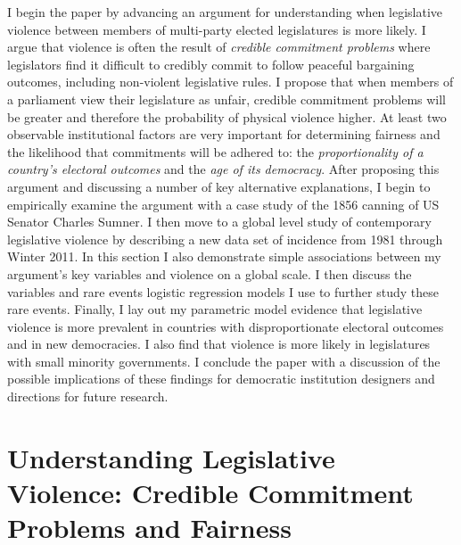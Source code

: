 \documentclass[a4paper]{article}\usepackage[]{graphicx}\usepackage[]{color}
\begin{document}
I begin the paper by advancing an argument for understanding when legislative violence between members of multi-party elected legislatures is more likely. I argue that violence is often the result of \emph{credible commitment problems} where legislators find it difficult to credibly commit to follow peaceful bargaining outcomes, including non-violent legislative rules. I propose that when members of a parliament view their legislature as unfair, credible commitment problems will be greater and therefore the probability of physical violence higher. At least two observable institutional factors are very important for determining fairness and the likelihood that commitments will be adhered to: the \emph{proportionality of a country's electoral outcomes} and the \emph{age of its democracy}. After proposing this argument and discussing a number of key alternative explanations, I begin to empirically examine the argument with a case study of the 1856 canning of US Senator Charles Sumner. I then move to a global level study of contemporary legislative violence by describing a new data set of incidence from 1981 through Winter 2011. In this section I also demonstrate simple associations between my argument's key variables and violence on a global scale. I then discuss the variables and rare events logistic regression models \citep{KingRareEvents2001, KingRareEventsPA2001} I use to further study these rare events. Finally, I lay out my parametric model evidence that legislative violence is more prevalent in countries with disproportionate electoral outcomes and in new democracies. I also find that violence is more likely in legislatures with small minority governments. I conclude the paper with a discussion of the possible implications of these findings for democratic institution designers and directions for future research.


\section{Understanding Legislative Violence: Credible Commitment Problems and Fairness}
\end{document}
